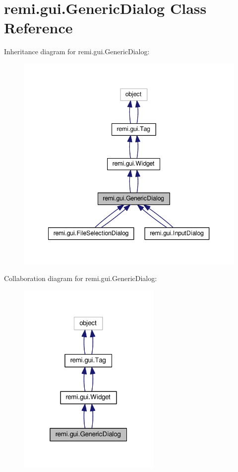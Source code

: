 \hypertarget{classremi_1_1gui_1_1GenericDialog}{}\section{remi.\+gui.\+Generic\+Dialog Class Reference}
\label{classremi_1_1gui_1_1GenericDialog}


Inheritance diagram for remi.\+gui.\+Generic\+Dialog\+:
\nopagebreak
\begin{figure}[H]
\begin{center}
\leavevmode
\includegraphics[width=340pt]{d6/de3/classremi_1_1gui_1_1GenericDialog__inherit__graph}
\end{center}
\end{figure}


Collaboration diagram for remi.\+gui.\+Generic\+Dialog\+:
\nopagebreak
\begin{figure}[H]
\begin{center}
\leavevmode
\includegraphics[width=196pt]{db/d9d/classremi_1_1gui_1_1GenericDialog__coll__graph}
\end{center}
\end{figure}
